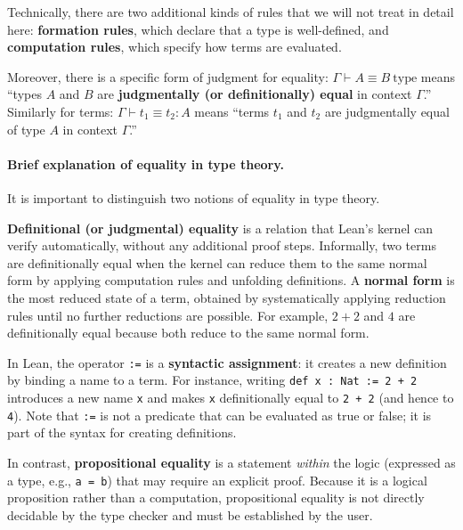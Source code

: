 Technically, there are two additional kinds of rules that we will not
treat in detail here:
\textbf{formation rules}, which declare that a type is well-defined,
and \textbf{computation rules}, which specify how terms are evaluated.

Moreover, there is a specific form of judgment for equality:
$\Gamma \vdash A \equiv B\ \text{type}$ means ``types $A$ and $B$ are
\textbf{judgmentally (or definitionally) equal} in context $\Gamma$.''
Similarly for terms: $\Gamma \vdash t_1 \equiv t_2 : A$ means
``terms $t_1$ and $t_2$ are judgmentally equal of type $A$ in
context $\Gamma$.''

\paragraph{Brief explanation of equality in type theory.}

It is important to distinguish two notions of equality in type theory.

\textbf{Definitional (or judgmental) equality} is a relation that
Lean's kernel can verify automatically, without any additional proof
steps.
Informally, two terms are definitionally equal when the kernel can
reduce them to the same normal form by applying computation rules and
unfolding definitions.
A \textbf{normal form} is the most reduced state of a term, obtained
by systematically applying reduction rules until no further reductions
are possible.
For example, $2 + 2$ and $4$ are definitionally equal because both
reduce to the same normal form.

In Lean, the operator \lstinline[language=lean]|:=| is a
\textbf{syntactic assignment}: it creates a new definition by binding
a name to a term.
For instance, writing \lstinline[language=lean]|def x : Nat := 2 + 2|
introduces a new name \lstinline[language=lean]|x| and makes
\lstinline[language=lean]|x| definitionally equal to
\lstinline[language=lean]|2 + 2| (and hence to
\lstinline[language=lean]|4|).
Note that \lstinline[language=lean]|:=| is not a predicate that can be
evaluated as true or false; it is part of the syntax for creating
definitions.

In contrast, \textbf{propositional equality} is a statement
\emph{within} the logic (expressed as a type, e.g.,
\lstinline[language=lean]|a = b|) that may require an explicit proof.
Because it is a logical proposition rather than a computation,
propositional equality is not directly decidable by the type checker
and must be established by the user.

